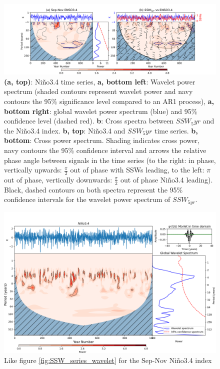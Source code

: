 \begin{figure}[h!]
\begin{center}
\noindent\includegraphics[width = \linewidth]{Figures/Figures-origins/ENSO_wavelet_combined.png}
\caption[Wavelet power spectrum for Sep-Nov Ni\~{n}o3.4 index and cross power spectrum with SSW$_{5yr}$]{\textbf{(a, top)}: Ni\~{n}o3.4 time series, \textbf{a, bottom left}: Wavelet power spectrum (shaded contours represent wavelet power and navy contours the 95\% significance level compared to an AR1 process), \textbf{a, bottom right}: global wavelet power spectrum (blue) and 95\% confidence level (dashed red). \textbf{b}: Cross spectra between $SSW_5yr$ and the Ni\~{n}o3.4 index. \textbf{b, top}: Ni\~{n}o3.4 and $SSW_5yr$ time series. \textbf{b, bottom}: Cross power spectrum. Shading indicates cross power, navy contours the 95\% confidence interval and arrows the relative phase angle between signals in the time series (to the right: in phase, vertically upwards: $\frac{\pi}{2}$ out of phase with SSWs leading, to the left: $\pi$ out of phase, vertically downwards: $\frac{\pi}{2}$ out of phase Ni\~{n}o3.4 leading). Black, dashed contours on both spectra represent the 95\% confidence intervals for the wavelet power spectrum of $SSW_{5yr}$.}
\label{fig:ENSO_wavelet}
\end{center}
\end{figure}

\begin{figure}[h!]
\begin{center}
\noindent\includegraphics[width = \linewidth]{Figures/Figures-origins/ENSO_wavelet_unsmoothed.png}
\caption{Like figure \ref{fig:SSW_series_wavelet} for the Sep-Nov  Ni\~{n}o3.4 index} 
\label{fig:ENSO_unsmoothed_wavelet}
\end{center}
\end{figure}

